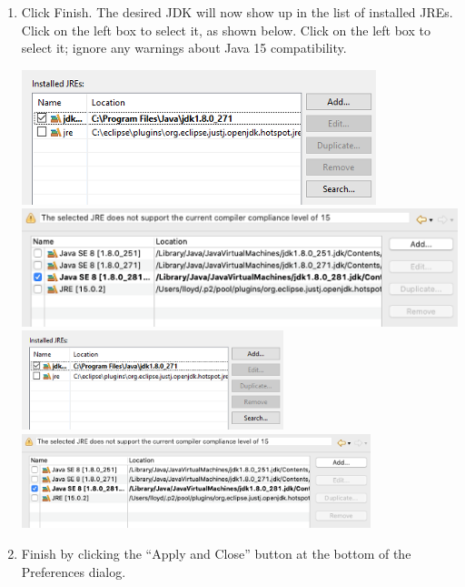 \begin{enumerate}
\item Click {\sf Finish}. The desired JDK will now show up in the list of
installed JREs. 
\ifWindows %
Click on the left box to select it, as shown below.
\fi %
\fi %
\ifLinux %
Click on the left box to select it; ignore any warnings about Java
15 compatibility.
\else %
\begin{center}
\iflatexml
  \ifWindows
     \includegraphics[]{images/EclipseInstalledJREs}
  \else
     \includegraphics[]{images/EclipseInstalledJREsMacOS}
  \fi
\else
  \ifWindows
     \includegraphics[width=0.6\textwidth]{images/EclipseInstalledJREs}
  \else
     \includegraphics[width=0.8\textwidth]{images/EclipseInstalledJREsMacOS}
  \fi
\fi
\end{center}
\fi %

\item Finish by clicking the ``{\sf Apply and Close}'' button at the
bottom of the {\sf Preferences} dialog.

\end{enumerate}

